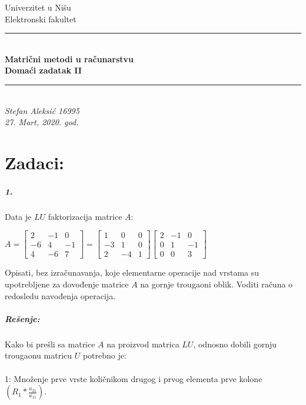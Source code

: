 \documentclass[11pt]{article}
\newcommand{\doublerule}[1][.4pt]{%
  \noindent
  \makebox[0pt][l]{\rule[.7ex]{\linewidth}{#1}}%
  \rule[.3ex]{\linewidth}{#1}}
\begin{document}
\begin{titlepage}
\begin {center}
\huge {Univerzitet u Nišu\\Elektronski fakultet
\vspace{7.5cm}
\\
\doublerule
\\
\vspace{1cm}
\textbf {\Huge{{Matrični metodi u računarstvu \\ Domaći zadatak II}}}
\vspace{1cm}
\\
\doublerule
\\
\vspace{7.5cm}
\textit{{Stefan Aleksić 16995}\\\Large{27. Mart, 2020. god.}}}
\end{center}
\end{titlepage}
\newpage
\large{
\section*{Zadaci:}}
\subparagraph*{1.}
{Data je $LU$ faktorizacija matrice $A$:\vspace{3mm}
\begin{center}
$
A =
\begin{bmatrix}
2 & -1 & 0\\
-6 & 4 & -1\\
4 & -6 & 7
\end{bmatrix}
=
\begin{bmatrix}
1 & 0 & 0\\
-3 & 1 & 0\\
2 & -4 & 1
\end{bmatrix}
\begin{bmatrix}
2 & -1 & 0\\
0 & 1 & -1\\
0 & 0 & 3
\end{bmatrix}
$\vspace{3mm}
\end{center}
Opisati, bez izračunavanja, koje elementarne operacije nad vrstama su upotrebljene za dovođenje matrice $A$ na gornje trougaoni oblik. Voditi računa o redosledu navođenja operacija.
}
\subparagraph*{Rešenje:}
Kako bi prešli sa matrice $A$ na proizvod matrica $LU$, odnosno dobili gornju trougaonu matricu $U$ potrebno je:\\
\\
1: Množenje prve vrste količnikom drugog i prvog elementa prve kolone $(R_1*\frac{\displaystyle{a_{21}}}{\displaystyle{a_{11}}})$.\\
\end{document}
